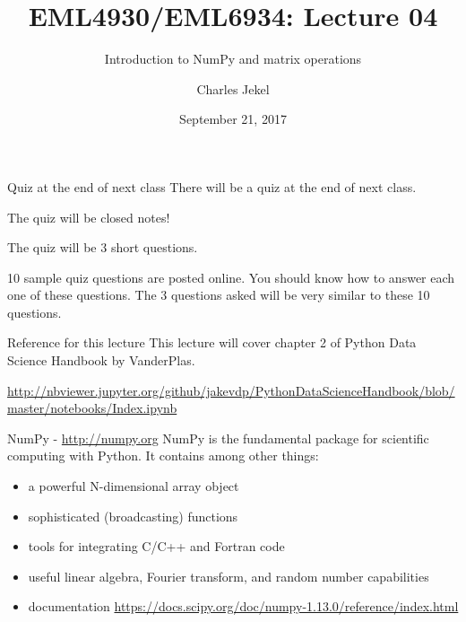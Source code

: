 \documentclass[10pt]{beamer}
\title{EML4930/EML6934: Lecture 04}
\subtitle{Introduction to NumPy and matrix operations}
\date{September 21, 2017}
\author{Charles Jekel}
\begin{document}
\maketitle

\begin{frame}{Quiz at the end of next class}
There will be a quiz at the end of next class. 

The quiz will be closed notes!

The quiz will be 3 short questions. 

10 sample quiz questions are posted online. You should know how to answer each one of these questions. The 3 questions asked will be very similar to these 10 questions.
\end{frame}


\begin{frame}{Reference for this lecture}
This lecture will cover chapter 2 of Python Data Science Handbook by VanderPlas. 

\url{http://nbviewer.jupyter.org/github/jakevdp/PythonDataScienceHandbook/blob/master/notebooks/Index.ipynb}
\end{frame}

\begin{frame}{NumPy - \url{http://numpy.org}}
NumPy is the fundamental package for scientific computing with Python. It contains among other things:
\begin{itemize}
\item a powerful N-dimensional array object
\item sophisticated (broadcasting) functions
\item tools for integrating C/C++ and Fortran code
\item useful linear algebra, Fourier transform, and random number capabilities
\item documentation \url{https://docs.scipy.org/doc/numpy-1.13.0/reference/index.html}
\end{itemize}
\end{frame}
\end{document}
